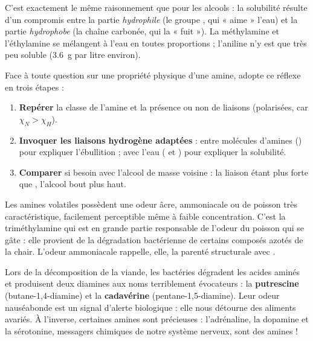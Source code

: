 \documentclass[11pt]{article}
\newcommand{\cle}[1]{{\popxbold\color{popdark}#1}}
\newcounter{popsec}
\newcounter{popsub}
\newcommand{\courssub}[1]{%
  \stepcounter{popsub}%
  \par\vspace{9pt}\noindent{\popxbold\fontsize{11.5}{13}\selectfont\color{popink}{\color{poporange}\thepopsec.\thepopsub}\hspace{6pt}#1}\par\nopagebreak\vspace{4pt}
}
\begin{document}
C'est exactement le même raisonnement que pour les alcools : la solubilité résulte d'un compromis entre la partie \emph{hydrophile} (le groupe , qui « aime » l'eau) et la partie \emph{hydrophobe} (la chaîne carbonée, qui la « fuit »). La méthylamine et l'éthylamine se mélangent à l'eau en toutes proportions ; l'aniline n'y est que très peu soluble (\SI{3,6}{g} par litre environ).

\begin{methode}
Face à toute question sur une propriété physique d'une amine, adopte ce réflexe en trois étapes :
\begin{enumerate}
\item \textbf{Repérer} la classe de l'amine et la présence ou non de liaisons  (polarisées, car $\chi_N > \chi_H$).
\item \textbf{Invoquer les liaisons hydrogène adaptées} : entre molécules d'amines () pour expliquer l'ébullition ; avec l'eau ( et ) pour expliquer la solubilité.
\item \textbf{Comparer} si besoin avec l'alcool de masse voisine : la liaison  étant plus forte que , l'alcool bout plus haut.
\end{enumerate}
\end{methode}

\courssub{Odeur des amines}

Les amines volatiles possèdent une odeur \cle{âcre}, \cle{ammoniacale} ou de \cle{poisson} très caractéristique, facilement perceptible même à faible concentration. C'est la triméthylamine  qui est en grande partie responsable de l'odeur du poisson qui se gâte : elle provient de la dégradation bactérienne de certains composés azotés de la chair. L'odeur ammoniacale rappelle, elle, la parenté structurale avec .

\begin{savaistu}
Lors de la décomposition de la viande, les bactéries dégradent les acides aminés et produisent deux diamines aux noms terriblement évocateurs : la \textbf{putrescine}  (butane-1,4-diamine) et la \textbf{cadavérine}  (pentane-1,5-diamine). Leur odeur nauséabonde est un signal d'alerte biologique : elle nous détourne des aliments avariés. À l'inverse, certaines amines sont précieuses : l'adrénaline, la dopamine et la sérotonine, messagers chimiques de notre système nerveux, sont des amines !
\end{savaistu}
\end{document}
